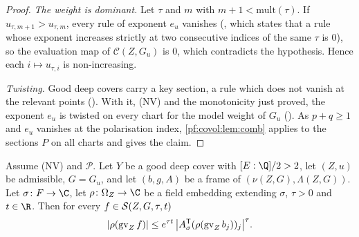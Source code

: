 \begin{proof}
\emph{The weight is dominant.} Let $\tau$ and $m$ with $m+1<\mathrm{mult}(\tau)$. If
$u_{\tau,m+1}>u_{\tau,m}$, every rule of exponent $e_u$ vanishes
(, which states that a rule whose exponent increases
strictly at two consecutive indices of the same $\tau$ is $0$), so the evaluation map of $\mathcal C(Z,G_u)$
is $0$, which contradicts the hypothesis. Hence each $i\mapsto u_{\tau,i}$ is non-increasing.

\emph{Twisting.} Good deep covers carry a key section, a rule which does not vanish at the relevant points
(). With it, (NV) and the monotonicity just proved, the
exponent $e_u$ is twisted on every chart for the model weight of $G_u$
(). As $p+q\ge1$ and $e_u$ vanishes at the
polarisation index, \cref{pf:covol:lem:comb} applies to the sections $P$ on all charts and gives the claim.
\end{proof}

\begin{proposition}\label{pf:covol:prop:archsmall}
Assume (NV) and $\mathcal P$. Let $Y$ be a good deep cover with $[E:\Q]/2>2$, let $(Z,u)$ be admissible,
$G=G_u$, and let $(b,g,A)$ be a frame of $(\nu(Z,G),\Lambda(Z,G))$. Let $\sigma\colon F\to\C$, let
$\rho\colon\Omega_Z\to\C$ be a field embedding extending $\sigma$, $\tau>0$ and $t\in\R$. Then for every
$f\in\mathcal{S}(Z,G,\tau,t)$
\[
|\rho(\operatorname{gv}_Zf)|\le e^{\tau t}\,\bigl|A_\sigma^{\mathsf T}(\rho(\operatorname{gv}_Zb_j))_j\bigr|^\tau .
\]
%
\end{proposition}


